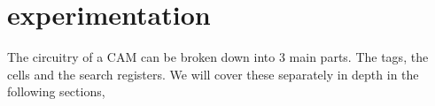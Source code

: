 \section{experimentation}
The circuitry of a CAM can be broken down into 3 main parts. The tags, the cells and the search registers. 
We will cover these separately in depth in the following sections, 
